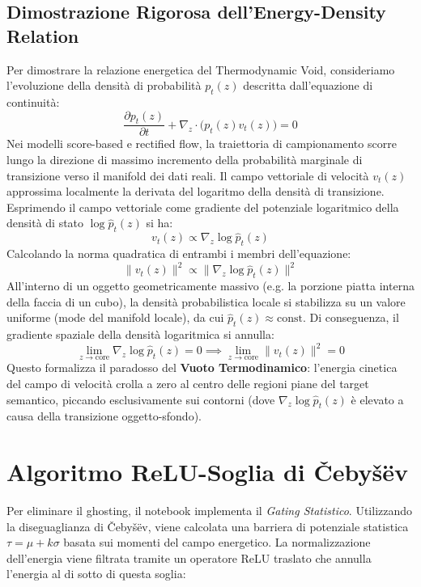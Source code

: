 \documentclass[12pt,a4paper]{report}
\begin{document}
\subsection{Dimostrazione Rigorosa dell'Energy-Density Relation}
Per dimostrare la relazione energetica del Thermodynamic Void, consideriamo l'evoluzione della densità di probabilità $p_t(z)$ descritta dall'equazione di continuità:
\begin{equation}
    \frac{\partial p_t(z)}{\partial t} + \nabla_z \cdot \big( p_t(z) v_t(z) \big) = 0
\end{equation}
Nei modelli score-based e rectified flow, la traiettoria di campionamento scorre lungo la direzione di massimo incremento della probabilità marginale di transizione verso il manifold dei dati reali. Il campo vettoriale di velocità $v_t(z)$ approssima localmente la derivata del logaritmo della densità di transizione. Esprimendo il campo vettoriale come gradiente del potenziale logaritmico della densità di stato $\log \hat{p}_t(z)$ si ha:
\begin{equation}
    v_t(z) \propto \nabla_z \log \hat{p}_t(z)
\end{equation}
Calcolando la norma quadratica di entrambi i membri dell'equazione:
\begin{equation}
    \|v_t(z)\|^2 \propto \| \nabla_z \log \hat{p}_t(z) \|^2
\end{equation}
All'interno di un oggetto geometricamente massivo (e.g. la porzione piatta interna della faccia di un cubo), la densità probabilistica locale si stabilizza su un valore uniforme (mode del manifold locale), da cui $\hat{p}_t(z) \approx \text{const}$. Di conseguenza, il gradiente spaziale della densità logaritmica si annulla:
\begin{equation}
    \lim_{z \to \text{core}} \nabla_z \log \hat{p}_t(z) = 0 \implies \lim_{z \to \text{core}} \|v_t(z)\|^2 = 0
\end{equation}
Questo formalizza il paradosso del \textbf{Vuoto Termodinamico}: l'energia cinetica del campo di velocità crolla a zero al centro delle regioni piane del target semantico, piccando esclusivamente sui contorni (dove $\nabla_z \log \hat{p}_t(z)$ è elevato a causa della transizione oggetto-sfondo).

\section{Algoritmo ReLU-Soglia di Čebyšëv}
Per eliminare il ghosting, il notebook implementa il \textit{Gating Statistico}. Utilizzando la diseguaglianza di Čebyšëv, viene calcolata una barriera di potenziale statistica $\tau = \mu + k\sigma$ basata sui momenti del campo energetico. La normalizzazione dell'energia viene filtrata tramite un operatore ReLU traslato che annulla l'energia al di sotto di questa soglia:
\end{document}
